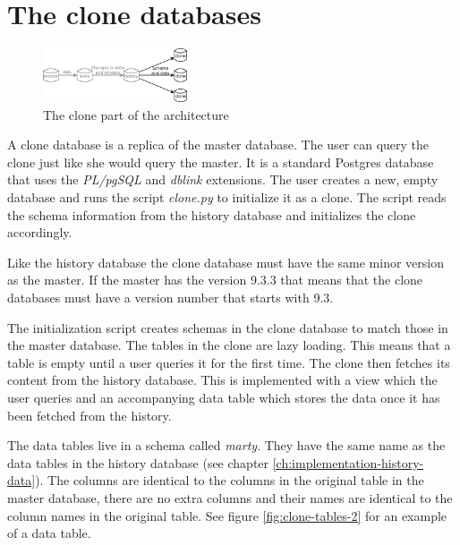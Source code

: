 \section{The clone databases}
\label{ch:impementation-clones}

\begin{figure}
  \vspace{-20pt}
  \begin{center}
    \includegraphics[width=0.38\textwidth]{img/architecture-clones}
  \end{center}
  \vspace{-20pt}
  \caption{The clone part of the architecture}
  \vspace{-10pt}
\end{figure}

A clone database is a replica of the master database.
The user can query the clone just like she would query the master.
It is a standard Postgres database that uses the \textit{PL/pgSQL} and \textit{dblink} extensions.
The user creates a new, empty database and runs the script \textit{clone.py} to initialize it as a clone.
The script reads the schema information from the history database and initializes the clone accordingly.

Like the history database the clone database must have the same minor version as the master.
If the master has the version 9.3.3 that means that the clone databases must have a version number that starts with 9.3.

The initialization script creates schemas in the clone database to match those in the master database.
The tables in the clone are lazy loading.
This means that a table is empty until a user queries it for the first time.
The clone then fetches its content from the history database.
This is implemented with a view which the user queries and an accompanying data table which stores the data once it has been fetched from the history.

The data tables live in a schema called \textit{marty}.
They have the same name as the data tables in the history database (see chapter \ref{ch:implementation-history-data}).
The columns are identical to the columns in the original table in the master database, there are no extra columns and their names are identical to the column names in the original table.
See figure \ref{fig:clone-tables-2} for an example of a data table.

